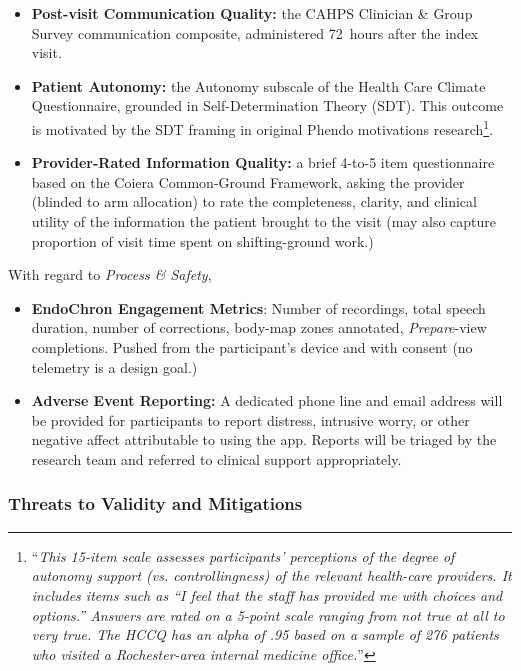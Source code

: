 \begin{itemize}
  \item \textbf{Post-visit Communication Quality:} the CAHPS Clinician \& Group Survey communication composite\cite{Dyer2012CAHPS}, administered 72~hours after the index visit.
  \item \textbf{Patient Autonomy:} the Autonomy subscale of the Health Care Climate Questionnaire\cite{Williams1996Autonomy}, grounded in Self-Determination Theory (SDT). This outcome is motivated by the SDT framing in original Phendo motivations research\cite{McKillop2016Participatory}\footnote{``\textit{This 15-item scale assesses participants' perceptions of the degree of autonomy support (vs. controllingness) of the relevant health-care providers. It includes items such as “I feel that the staff has provided me with choices and options.” Answers are rated on a 5-point scale ranging from not true at all to very true. The HCCQ has an alpha of .95 based on a sample of 276 patients who visited a Rochester-area internal medicine office.}''}.
  \item \textbf{Provider-Rated Information Quality:} a brief 4-to-5 item questionnaire based on the Coiera Common-Ground Framework\cite{Coiera2000ConversationModel}, asking the provider (blinded to arm allocation) to rate the completeness, clarity, and clinical utility of the information the patient brought to the visit (may also capture  proportion of visit time spent on shifting-ground work.)
\end{itemize}

\newpage
With regard to \textit{Process \& Safety},

\begin{itemize}
  \item \textbf{EndoChron Engagement Metrics}: Number of recordings, total speech duration, number of corrections, body-map zones annotated, \textit{Prepare}-view completions. Pushed from the participant's device and with consent (no telemetry is a design goal.)
  \item \textbf{Adverse Event Reporting:} A dedicated phone line and email address will be provided for participants to report distress, intrusive worry, or other negative affect attributable to using the app. Reports will be triaged by the research team and referred to clinical support appropriately.
\end{itemize}

\subsubsection{Threats to Validity and Mitigations}

